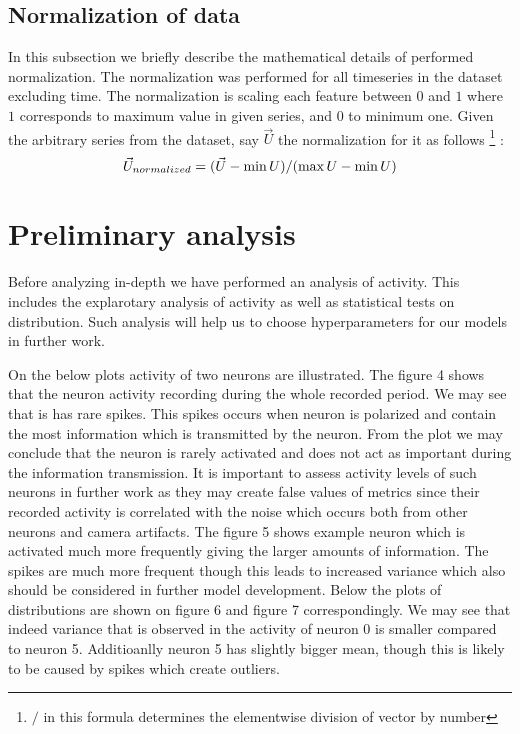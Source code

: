 \documentclass{article}
\begin{document}
	\subsection{Normalization of data}\label{subsec:normalization-of-data}

     In this subsection we briefly describe the mathematical details of performed normalization.
	The normalization was performed for all timeseries in the dataset excluding time.
	The normalization is scaling each feature between $0$ and $1$ where $1$ corresponds to maximum
	value in given series, and $0$ to minimum one.
	Given the arbitrary series from the dataset, say $\vec{U}$ the normalization for it as follows
	\footnote{$/$ in this formula determines the elementwise division of vector by number}
	:
	\[
		\vec{U}_{normalized} = (\vec{U} - \min{U}) / (\max{U} - \min{U})\space\space\space
	\]


	\section{Preliminary analysis}\label{sec:preliminary-analysis}

	Before analyzing in-depth we have performed an analysis of activity. This includes the explarotary analysis of activity
	as well as statistical tests on distribution. Such analysis will help us to choose hyperparameters for our models
	in further work.

	On the below plots activity of two neurons are illustrated. The figure 4 shows that the neuron activity recording
	during the whole recorded period. We may see that is has rare spikes. This spikes occurs when neuron is polarized and
	contain the most information which is transmitted by the neuron. From the plot we may conclude that the neuron is
	rarely activated and does not act as important during the information transmission. It is important to assess activity
	levels of such neurons in further work as they may create false values of metrics since their recorded activity is
	correlated with the noise which occurs both from other neurons and camera artifacts.
	The figure 5 shows example neuron which is activated much more frequently giving the larger amounts of information.
	The spikes are much more frequent though this leads to increased variance which also should be considered in further
	model development.
	Below the plots of distributions are shown on figure 6 and figure 7 correspondingly. We may see that indeed variance
	that is observed in the activity of neuron 0 is smaller compared to neuron 5. Additioanlly neuron 5 has slightly
	bigger mean, though this is likely to be caused by spikes which create outliers.
\end{document}
